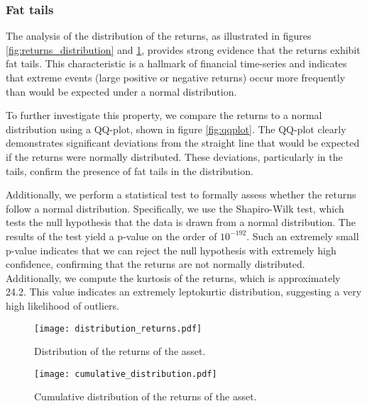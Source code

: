\subsubsection{Fat tails}
The analysis of the distribution of the returns, as illustrated in figures \ref{fig:returns_distribution} and \ref{fig:cumulative_returns_distribution}, provides strong evidence that the returns exhibit fat tails. This characteristic is a hallmark of financial time-series and indicates that extreme events (large positive or negative returns) occur more frequently than would be expected under a normal distribution.

To further investigate this property, we compare the returns to a normal distribution using a QQ-plot, shown in figure \ref{fig:qqplot}. The QQ-plot clearly demonstrates significant deviations from the straight line that would be expected if the returns were normally distributed. These deviations, particularly in the tails, confirm the presence of fat tails in the distribution.

Additionally, we perform a statistical test to formally assess whether the returns follow a normal distribution. Specifically, we use the Shapiro-Wilk test, which tests the null hypothesis that the data is drawn from a normal distribution. The results of the test yield a p-value on the order of $10^{-192}$. Such an extremely small p-value indicates that we can reject the null hypothesis with extremely high confidence, confirming that the returns are not normally distributed. Additionally, we compute the kurtosis of the returns, which is approximately 24.2. This value indicates an extremely leptokurtic distribution, suggesting a very high likelihood of outliers.
\begin{figure}[H]
    \centering
    \begin{minipage}[T]{0.45\textwidth}
        \centering
        \texttt{[image: distribution\_returns.pdf]}
        \caption{Distribution of the returns of the asset.}
        \label{fig:returns_distribution}
    \end{minipage}
    \hfill
    \begin{minipage}[T]{0.45\textwidth}
        \centering
        \texttt{[image: cumulative\_distribution.pdf]}
        \caption{Cumulative distribution of the returns of the asset.}
        \label{fig:cumulative_returns_distribution}
    \end{minipage}
\end{figure}


